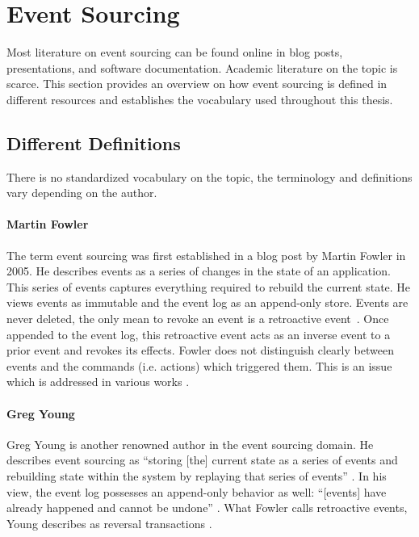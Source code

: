 \section{Event Sourcing}
\label{sec:es}
Most literature on event sourcing can be found online in blog posts, 
presentations, and software documentation. Academic literature on the 
topic is scarce.
This section provides an overview on how event sourcing is defined in
different resources and establishes the vocabulary used throughout this 
thesis.

\subsection{Different Definitions}
There is no standardized vocabulary on the topic, the terminology and 
definitions vary depending on the author. 

\paragraph{Martin Fowler}{
The term event sourcing was first established in a blog post by Martin 
Fowler \cite{Fowler2005} in 2005. 
He describes events as a series of changes in the state of an application. 
This series of events captures everything required to rebuild the current 
state. He views events as immutable and the event log as an append-only 
store. Events are never deleted, the only mean to revoke an event is a 
retroactive event~\cite{Fowler2005_2}. 
Once appended to the event log, this retroactive event acts as an inverse
event to a prior event and revokes its effects. 
%
Fowler does not distinguish clearly between events and the commands 
(i.e. actions) which triggered them.
This is an issue which is addressed in various works \cite{Chassaing2013, Reitzammer2013}.
}

\paragraph{Greg Young}{
Greg Young is another renowned author in the event sourcing domain. 
He describes event sourcing as ``storing [the] current state as a series of 
events and rebuilding state within the system by replaying that series of 
events'' \cite{Young2010}.
In his view, the event log possesses an append-only behavior as well: 
``[events] have already happened and cannot be undone'' \cite{Young2013}.
What Fowler calls retroactive events, Young describes as reversal
transactions \cite[p.31]{Young2013}.
}

